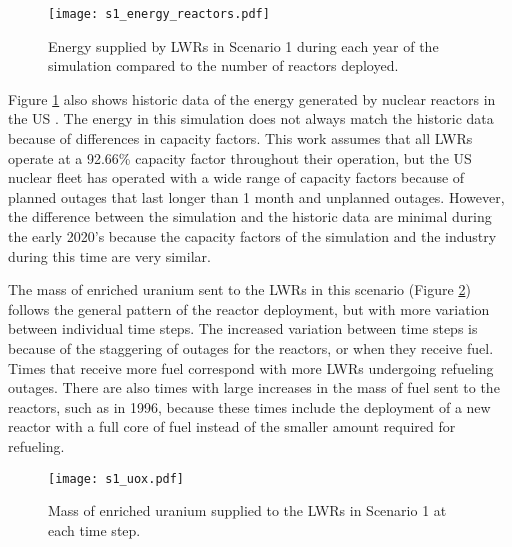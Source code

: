 \begin{figure}[h!]
    \centering
    \texttt{[image: s1\_energy\_reactors.pdf]}
    \caption{Energy supplied by \glspl{LWR} in Scenario 1 during each year of
    the simulation compared to the number of reactors deployed.}
    \label{fig:energy_reactor1}
\end{figure}

Figure \ref{fig:energy_reactor1} also shows historic data of the 
energy generated by nuclear reactors in the US \cite{noauthor_total_2022}.
The energy in this simulation does not always match the historic data 
because of differences in capacity factors. This work assumes that all 
\glspl{LWR} operate at a 92.66\% capacity factor throughout their operation, 
but the US nuclear fleet
has operated with a wide range of capacity factors because of planned outages 
that last longer than 1 month and unplanned outages. However, 
the difference between the simulation and the historic data are minimal 
during the early 2020's because the capacity factors of the simulation 
and the industry during this time are very similar. 

The mass of enriched uranium sent to the \glspl{LWR} in this scenario (Figure 
\ref{fig:fuel1}) follows the general pattern of the reactor deployment, but with 
more variation between individual time steps. The increased variation between 
time steps is because of the staggering of outages for the reactors, or when 
they receive fuel. Times that receive more fuel correspond with more 
\glspl{LWR} undergoing refueling outages. There are also times with large 
increases in the mass of fuel 
sent to the reactors, such as in 1996, because these times include the deployment 
of a new reactor with a full core of fuel instead of the smaller amount 
required for refueling.

\begin{figure}[h!]
    \centering
    \texttt{[image: s1\_uox.pdf]}
    \caption{Mass of enriched uranium supplied to the LWRs in Scenario 1 at each time step.}
    \label{fig:fuel1}
\end{figure}

